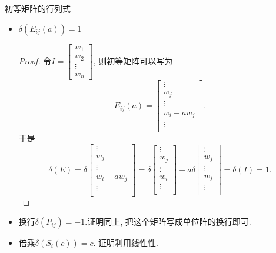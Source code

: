 初等矩阵的行列式
\begin{itemize}
    \item $\delta (E_{ij}(a)) = 1$
    \begin{proof}
        令$I = \begin{bmatrix} 
        w_1 \\ 
        w_2 \\ 
        \vdots \\ 
        w_n 
        \end{bmatrix}$, 则初等矩阵可以写为
        \begin{equation}
          E_{ij}(a) =  \begin{bmatrix}
           \vdots\\
           w_j\\
           \vdots\\
           w_i + a w_j\\
           \vdots\\
          \end{bmatrix}.
        \end{equation}
        于是
        \begin{equation}
            \delta(E) = 
            \delta \begin{bmatrix}
                \vdots\\
                w_j\\
                \vdots\\
                w_i + a w_j\\
                \vdots\\
               \end{bmatrix}
               = 
               \delta \begin{bmatrix}
                 \vdots\\
                 w_j\\
                 \vdots\\
                 w_i \\
                 \vdots\\
                \end{bmatrix}
               +
               a \delta 
               \begin{bmatrix}
                \vdots\\
                w_j\\
                \vdots\\
                w_j\\
                \vdots\\
               \end{bmatrix}
               =\delta (I) = 1.
        \end{equation}
    \end{proof}

    \item 换行$\delta (P_{ij})  =-1$.证明同上, 把这个矩阵写成单位阵的换行即可.
    \item 倍乘$\delta (S_{i}(c)) = c$. 证明利用线性性.
\end{itemize}

